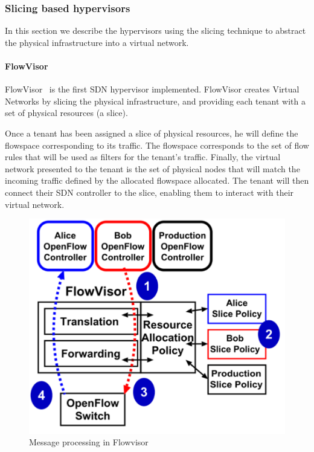 \subsubsection{Slicing based hypervisors}
\label{sec:existing-nhv}
In this section we describe the hypervisors using the slicing technique to abstract the physical infrastructure into a virtual network.

\paragraph{FlowVisor}

FlowVisor~\cite{FlowVisor-Sherwood2009} is the first SDN hypervisor implemented.
FlowVisor creates Virtual Networks by slicing the physical infrastructure, and providing each tenant with a set of physical resources (\ie a slice).

Once a tenant has been assigned a slice of physical resources, he will define the flowspace 
corresponding to its traffic.
The flowspace corresponds to the set of flow rules that will be used as filters for the tenant's traffic.
Finally, the virtual network presented to the tenant is the set of physical nodes that will match the incoming traffic defined by the allocated flowspace allocated.
The tenant will then connect their SDN controller to the slice, enabling them to interact with their virtual network.



\begin{figure}[h]
    \centering
    \includegraphics[scale=0.6]{figures/flowvisor-process.pdf}
    \caption{Message processing in Flowvisor~\cite{FlowVisor-Sherwood2009}}
    \label{fig:flowvisor-process}
\end{figure}

